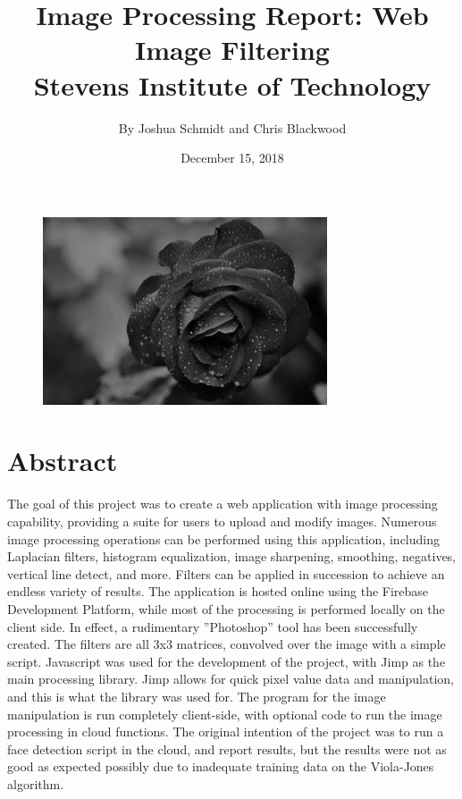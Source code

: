 \documentclass{article}
\title{%
    Image Processing Report: Web Image Filtering \\
    \large Stevens Institute of Technology}
\date{December 15, 2018}
\author{By Joshua Schmidt and Chris Blackwood}
\let\Oldsection\section
\renewcommand{\section}{\FloatBarrier\Oldsection}
\begin{document}
  \maketitle

  \bigskip
  \bigskip
  \bigskip
  \bigskip

  \begin{figure}[!htb]
    \centering
    \includegraphics[width=0.75\textwidth]{assets/logo.png}
    \label{fig:logo}
  \end{figure}

  \newpage

  \tableofcontents

  \newpage


  \section{Abstract}

  The goal of this project was to create a web application with image processing capability, providing a suite for users to upload and modify images. Numerous image processing operations can be performed using this application, including Laplacian filters, histogram equalization, image sharpening, smoothing, negatives, vertical line detect, and more. Filters can be applied in succession to achieve an endless variety of results. The application is hosted online using the Firebase Development Platform, while most of the processing is performed locally on the client side. In effect, a rudimentary ”Photoshop” tool has been successfully created. The filters are all 3x3 matrices, convolved over the image with a simple script. Javascript was used for the development of the project, with Jimp as the main processing library. Jimp allows for quick pixel value data and manipulation, and this is what the library was used for. The program for the image manipulation is run completely client-side, with optional code to run the image processing in cloud functions. The original intention of the project was to run a face detection script in the cloud, and report results, but the results were not as good as expected possibly due to inadequate training data on the Viola-Jones algorithm.  
\end{document}
